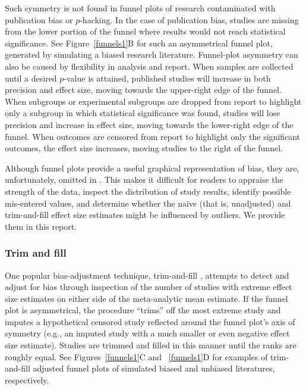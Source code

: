 \documentclass[man]{apa6}
\begin{document}
Such symmetry is not found in funnel plots of research contaminated with publication bias or $p$-hacking.  In the case of publication bias, studies are missing from the lower portion of the funnel where results would not reach statistical significance. See Figure~\ref{funnels1}B for such an asymmetrical funnel plot, generated by simulating a biased research literature. Funnel-plot asymmetry can also be caused by flexibility in analysis and report. When samples are collected until a desired $p$-value is attained, published studies will increase in both precision and effect size, moving towards the upper-right edge of the funnel. When subgroups or experimental subgroups are dropped from report to highlight only a subgroup in which statistical significance was found, studies will lose precision and increase in effect size, moving towards the lower-right edge of the funnel. When outcomes are censored from report to highlight only the significant outcomes, the effect size increases, moving studies to the right of the funnel.   %

Although funnel plots provide a useful graphical representation of bias, they are, unfortunately, omitted in \citet{Anderson:etal:2010}.  This makes it difficult for readers to appraise the strength of the data, inspect the distribution of study results, identify possible mis-entered values, and determine whether the na{\"i}ve (that is, unadjusted) and trim-and-fill effect size estimates might be influenced by outliers. We provide them in this report. 

\subsubsection{Trim and fill}
One popular bias-adjustment technique, trim-and-fill \citep{Duval:Tweedie:2000}, attempts to detect and adjust for bias through inspection of the number of studies with extreme effect size estimates on either side of the meta-analytic mean estimate. If the funnel plot is asymmetrical, the procedure ``trims'' off the most extreme study and imputes a hypothetical censored study reflected around the funnel plot's axis of symmetry (e.g., an imputed study with a much smaller or even negative effect size estimate). Studies are trimmed and filled in this manner until the ranks are roughly equal. See Figures~\ref{funnels1}C and ~\ref{funnels1}D for examples of trim-and-fill adjusted funnel plots of simulated biased and unbiased literatures, respectively. 
\end{document}
